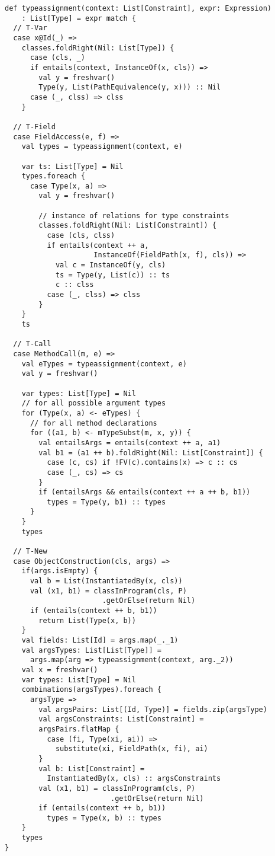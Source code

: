 %
\begin{lstlisting}[caption={Type Assignment},label=lst:typeass,captionpos=b,frame={lines}]
def typeassignment(context: List[Constraint], expr: Expression)
    : List[Type] = expr match {
  // T-Var
  case x@Id(_) =>
    classes.foldRight(Nil: List[Type]) {
      case (cls, _)
      if entails(context, InstanceOf(x, cls)) =>
        val y = freshvar()
        Type(y, List(PathEquivalence(y, x))) :: Nil
      case (_, clss) => clss
    }
    
  // T-Field
  case FieldAccess(e, f) =>
    val types = typeassignment(context, e)

    var ts: List[Type] = Nil
    types.foreach {
      case Type(x, a) =>
        val y = freshvar()

        // instance of relations for type constraints
        classes.foldRight(Nil: List[Constraint]) {
          case (cls, clss)
          if entails(context ++ a,
                     InstanceOf(FieldPath(x, f), cls)) =>
            val c = InstanceOf(y, cls)
            ts = Type(y, List(c)) :: ts
            c :: clss
          case (_, clss) => clss
        }
    }
    ts
    
  // T-Call
  case MethodCall(m, e) =>
    val eTypes = typeassignment(context, e)
    val y = freshvar()

    var types: List[Type] = Nil
    // for all possible argument types
    for (Type(x, a) <- eTypes) {
      // for all method declarations
      for ((a1, b) <- mTypeSubst(m, x, y)) {
        val entailsArgs = entails(context ++ a, a1)
        val b1 = (a1 ++ b).foldRight(Nil: List[Constraint]) {
          case (c, cs) if !FV(c).contains(x) => c :: cs
          case (_, cs) => cs
        }
        if (entailsArgs && entails(context ++ a ++ b, b1))
          types = Type(y, b1) :: types
      }
    }
    types
    
  // T-New
  case ObjectConstruction(cls, args) =>
    if(args.isEmpty) {
      val b = List(InstantiatedBy(x, cls))
      val (x1, b1) = classInProgram(cls, P)
                       .getOrElse(return Nil)
      if (entails(context ++ b, b1))
        return List(Type(x, b))
    }
    val fields: List[Id] = args.map(_._1)
    val argsTypes: List[List[Type]] =
      args.map(arg => typeassignment(context, arg._2))
    val x = freshvar()
    var types: List[Type] = Nil
    combinations(argsTypes).foreach {
      argsType =>
        val argsPairs: List[(Id, Type)] = fields.zip(argsType)
        val argsConstraints: List[Constraint] =
        argsPairs.flatMap {
          case (fi, Type(xi, ai)) =>
            substitute(xi, FieldPath(x, fi), ai)
        }
        val b: List[Constraint] =
          InstantiatedBy(x, cls) :: argsConstraints
        val (x1, b1) = classInProgram(cls, P)
                         .getOrElse(return Nil)
        if (entails(context ++ b, b1))
          types = Type(x, b) :: types
    }
    types
}
\end{lstlisting}

